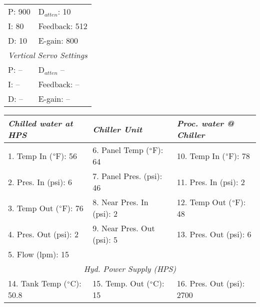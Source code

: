 \documentclass[letterpaper, 10pt]{article}
\begin{document}
\begin{table}[!ht]
        \footnotesize
        \renewcommand{\arraystretch}{1.1}
        \begin{tabular}{ p{1cm}|p{2cm} } \rowcolor[HTML]{EFEFEF}
            \multicolumn{2}{c}{\textit{Horizontal Servo Settings} \cellcolor[HTML]{EFEFEF}} \\ \hline P: 900 & D$_{atten}$: 10 \\ \hline
        I: 80 & Feedback: 512 \\ \hline 
        D: 10 & E-gain: 800 \\ \hline 
        \multicolumn{2}{c}{\textit{Vertical Servo Settings} \cellcolor[HTML]{EFEFEF}} \\ \hline 
        P: -- & D$_{atten}$  -- \\ \hline 
        I: -- & Feedback: -- \\ \hline
        D: -- & E-gain: -- \\ \hline 
    \end{tabular} \hfill 
        \renewcommand{\arraystretch}{1.1}
        \begin{tabular}{ l|l|l } \rowcolor[HTML]{EFEFEF}
        \textit{Chilled water at HPS} & \textit{Chiller Unit} & \textit{Proc. water @ Chiller} \\ \hline 1. Temp In ($\degree$F): 56 & 6. Panel Temp ($\degree$F): 64 & 10. Temp In ($\degree$F): 78 \\ \hline 
    2. Pres. In (psi): 6 & 7. Panel Pres. (psi): 46 & 11. Pres. In (psi): 2 \\ \hline 
    3. Temp Out ($\degree$F): 76 & 8. Near Pres. In (psi): 2& 12. Temp Out ($\degree$F): 48 \\ \hline 
    4. Pres. Out (psi): 2& 9. Near Pres. Out (psi): 5& 13. Pres. Out (psi): 6 \\ \hline 
    5. Flow (lpm): 15 \\ \hline 
    \multicolumn{3}{c}{\textit{Hyd. Power Supply (HPS)} \cellcolor[HTML]{EFEFEF}} \\ \hline 
    14. Tank Temp ($\degree$C): 50.8 & 15. Temp. Out ($\degree$C): 15 & 16. Pres. Out (psi): 2700 \\ \hline 
    \end{tabular} 
    \end{table} \vspace{-0.5cm} 
\end{document}

